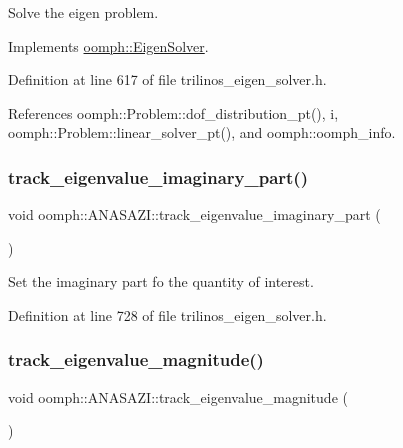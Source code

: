 Solve the eigen problem. 



Implements \hyperlink{classoomph_1_1EigenSolver_a6a6b09612ce16457b26fa0cfe996fa71}{oomph\+::\+Eigen\+Solver}.



Definition at line 617 of file trilinos\+\_\+eigen\+\_\+solver.\+h.



References oomph\+::\+Problem\+::dof\+\_\+distribution\+\_\+pt(), i, oomph\+::\+Problem\+::linear\+\_\+solver\+\_\+pt(), and oomph\+::oomph\+\_\+info.

\mbox{\label{classoomph_1_1ANASAZI_ab68875d414ab91de32715ab87e20b5ce}} 
\subsubsection{\texorpdfstring{track\+\_\+eigenvalue\+\_\+imaginary\+\_\+part()}{track\_eigenvalue\_imaginary\_part()}}
{\footnotesize\ttfamily void oomph\+::\+A\+N\+A\+S\+A\+Z\+I\+::track\+\_\+eigenvalue\+\_\+imaginary\+\_\+part (\begin{DoxyParamCaption}{ }\end{DoxyParamCaption})\hspace{0.3cm}{\ttfamily [inline]}}



Set the imaginary part fo the quantity of interest. 



Definition at line 728 of file trilinos\+\_\+eigen\+\_\+solver.\+h.

\mbox{\label{classoomph_1_1ANASAZI_a08a235118d10b28a6f03cc9f6d6ca503}} 
\subsubsection{\texorpdfstring{track\+\_\+eigenvalue\+\_\+magnitude()}{track\_eigenvalue\_magnitude()}}
{\footnotesize\ttfamily void oomph\+::\+A\+N\+A\+S\+A\+Z\+I\+::track\+\_\+eigenvalue\+\_\+magnitude (\begin{DoxyParamCaption}{ }\end{DoxyParamCaption})\hspace{0.3cm}{\ttfamily [inline]}}



